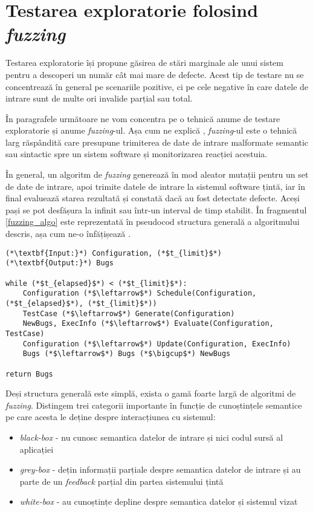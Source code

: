 \section{Testarea exploratorie folosind \emph{fuzzing}}

Testarea exploratorie își propune găsirea de stări marginale ale unui sistem pentru a descoperi un număr cât mai mare de defecte. Acest tip de testare nu se concentrează în general pe scenariile pozitive, ci pe cele negative în care datele de intrare sunt de multe ori invalide parțial sau total.

În paragrafele următoare ne vom concentra pe o tehnică anume de testare exploratorie și anume \textit{fuzzing}-ul. Așa cum ne explică \citet{Manes2021}, \textit{fuzzing}-ul este o tehnică larg răspândită care presupune trimiterea de date de intrare malformate semantic sau sintactic spre un sistem software și monitorizarea reacției acestuia. 

În general, un algoritm de \textit{fuzzing} generează în mod aleator mutații pentru un set de date de intrare, apoi trimite datele de intrare la sistemul software țintă, iar în final evaluează starea rezultată și constată dacă au fost detectate defecte. Aceși pași se pot desfășura la infinit sau într-un interval de timp stabilit. În fragmentul \ref{fuzzing_algo} este reprezentată în pseudocod structura generală a algoritmului descris, așa cum ne-o înfățișează \citet{Manes2021}.

\begin{lstlisting}[label={fuzzing_algo}, caption={Structura generală a unui algoritm de fuzzing}]
(*\textbf{Input:}*) Configuration, (*$t_{limit}$*)
(*\textbf{Output:}*) Bugs

while (*$t_{elapsed}$*) < (*$t_{limit}$*):
    Configuration (*$\leftarrow$*) Schedule(Configuration, (*$t_{elapsed}$*), (*$t_{limit}$*))
    TestCase (*$\leftarrow$*) Generate(Configuration)
    NewBugs, ExecInfo (*$\leftarrow$*) Evaluate(Configuration, TestCase)
    Configuration (*$\leftarrow$*) Update(Configuration, ExecInfo)
    Bugs (*$\leftarrow$*) Bugs (*$\bigcup$*) NewBugs
    
return Bugs
\end{lstlisting}

Deși structura generală este simplă, exista o gamă foarte largă de algoritmi de \textit{fuzzing}. Distingem trei categorii importante în funcție de cunoștințele semantice pe care acesta le deține despre interacțiunea cu sistemul:

\begin{itemize}
    \item \textit{black-box} - nu cunosc semantica datelor de intrare și nici codul sursă al aplicației
    \item \textit{grey-box} - dețin informații parțiale despre semantica datelor de intrare și au parte de un \textit{feedback} parțial din partea sistemului țintă
    \item \textit{white-box} - au cunoștințe depline despre semantica datelor și sistemul vizat
\end{itemize}

